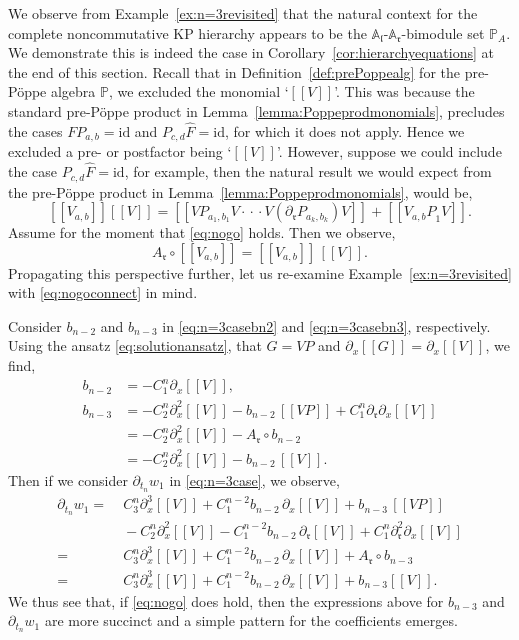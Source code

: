 \documentclass[5p,twocolumn]{elsarticle}
\newcommand*{\id}{{\mathrm{id}}}
\newcommand*{\pa}{{\partial}}
\newcommand*{\lb}{[\![}
\newcommand*{\rb}{]\!]}
\newcommand*{\el}{\mathfrak l}
\newcommand*{\rl}{\mathfrak r}
\begin{document}
We observe from Example~\ref{ex:n=3revisited} that the natural context for the complete noncommutative KP hierarchy appears to be the $\mathbb{A}_{\el}$-$\mathbb{A}_{\rl}$-bimodule set $\mathbb{P}_A$.
We demonstrate this is indeed the case in Corollary~\ref{cor:hierarchyequations} at the end of this section.
Recall that in Definition~\ref{def:prePoppealg} for the pre-P\"oppe algebra $\mathbb{P}$, we excluded the monomial `$\lb V\rb$'.
This was because the standard pre-P\"oppe product in Lemma~\ref{lemma:Poppeprodmonomials}, precludes the cases $FP_{a,b}=\id$ and $P_{c,d}\hat{F}=\id$, for which it does not apply.
Hence we excluded a pre- or postfactor being `$\lb V\rb$'.
However, suppose we could include the case $P_{c,d}\hat F=\id$, for example, then the natural result we would expect from the pre-P\"oppe product in Lemma~\ref{lemma:Poppeprodmonomials}, would be,
\begin{equation}\label{eq:nogo}
  \lb V_{a,b}\rb \lb V\rb=\lb VP_{a_1,b_1}V\cdot\!\cdot\!\cdot V(\pa_\rl P_{a_k,b_k})V\rb+\lb V_{a,b}P_{\hat{1}}V\rb.
\end{equation}
Assume for the moment that \eqref{eq:nogo} holds.
Then we observe, 
\begin{equation}\label{eq:nogoconnect}
  A_{\rl}\circ\lb V_{a,b}\rb=\lb V_{a,b}\rb\,\lb V\rb.
\end{equation}
Propagating this perspective further, let us re-examine Example~\ref{ex:n=3revisited} with \eqref{eq:nogoconnect} in mind.
%
\begin{example}\label{ex:n=3reprised}
  Consider $b_{n-2}$ and $b_{n-3}$ in \eqref{eq:n=3casebn2} and \eqref{eq:n=3casebn3}, respectively.
  Using the ansatz \eqref{eq:solutionansatz}, that $G=VP$ and $\pa_x\lb G\rb=\pa_x\lb V\rb$, we find,
  \begin{align*}
       b_{n-2}&=-C_1^n\pa_x\lb V\rb,\\
       b_{n-3}&=-C_2^n\pa_x^2\lb V\rb-b_{n-2}\,\lb VP\rb+C_1^n\pa_{\rl}\pa_x\lb V\rb\\
             &=-C_2^n\pa_x^2\lb V\rb-A_{\rl}\circ b_{n-2}\\
             &=-C_2^n\pa_x^2\lb V\rb-b_{n-2}\,\lb V\rb. 
  \end{align*}
  Then if we consider $\pa_{t_n}w_1$ in \eqref{eq:n=3case}, we observe,
  \begin{align*}
    \pa_{t_n}w_1=&\;C_3^n\pa_x^3\lb V\rb+C_1^{n-2}b_{n-2}\,\pa_x\lb V\rb+b_{n-3}\,\lb VP\rb\\
                &\;-C_2^n\pa_x^2\lb V\rb-C_1^{n-2}b_{n-2}\,\pa_{\rl}\lb V\rb+C_1^n\pa_{\rl}^2\pa_x\lb V\rb\\
               =&\;C_3^n\pa_x^3\lb V\rb+C_1^{n-2}b_{n-2}\,\pa_x\lb V\rb+A_{\rl}\circ b_{n-3}\\
               =&\;C_3^n\pa_x^3\lb V\rb+C_1^{n-2}b_{n-2}\,\pa_x\lb V\rb+b_{n-3}\lb V\rb. 
  \end{align*}
  We thus see that, if \eqref{eq:nogo} does hold, then the expressions above for $b_{n-3}$ and $\pa_{t_n}w_1$
  are more succinct and a simple pattern for the coefficients emerges.
\end{example}
\end{document}
